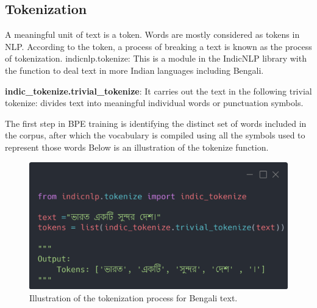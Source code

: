 \subsection{Tokenization}

A meaningful unit of text is a token. Words are mostly considered as tokens in NLP. According to the token, a process of breaking a text is known as the process of tokenization.
indicnlp.tokenize: This is a module in the IndicNLP library with the function to deal text in more Indian languages including Bengali.

\textbf{indic\_tokenize.trivial\_tokenize}: It carries out the text in the following trivial tokenize: divides text into meaningful individual words or punctuation symbols.

The first step in BPE training is identifying the distinct set of words included in the corpus, after which the vocabulary is compiled using all the symbols used to represent those words Below is an illustration of the tokenize function.

\begin{figure}[H]
    \centering
    \includegraphics[width=0.8\linewidth]{Attachments/Figures/tokenizer_figure1.png}
    \caption{Illustration of the tokenization process for Bengali text.}
\end{figure}